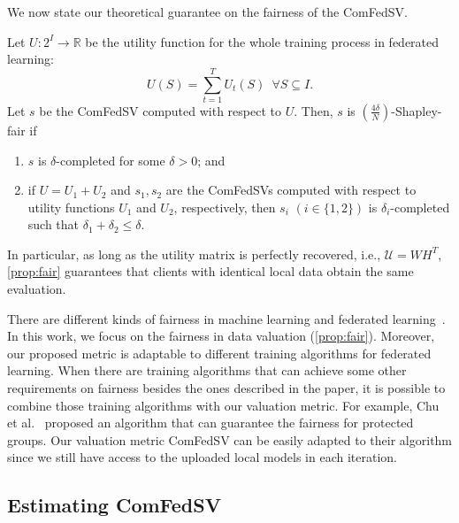 We now state our theoretical guarantee on the fairness of the ComFedSV. 

\begin{theorem} \label{prop:fair}
    Let $U: 2^I \to \mathbb{R}$ be the utility function for the whole training process in federated learning: 
    \[U(S) = \sum_{t=1}^T U_t(S) \enspace \forall S \subseteq I.\]
    Let $s$ be the ComFedSV computed with respect to $U$.  Then, $s$ is $(\frac{4\delta}{N})$-Shapley-fair if
    \begin{enumerate}
        \item  $s$ is $\delta$-completed for some $\delta > 0$; and 
        \item if $U = U_1 + U_2$ and $s_1, s_2$ are the ComFedSVs computed with respect to utility functions $U_1$ and $U_2$, respectively, then $s_i$ $(i \in \{1,2\})$ is $\delta_i$-completed such that $\delta_1 + \delta_2 \leq \delta$. 
    \end{enumerate}
\end{theorem}

In particular, as long as the utility matrix is perfectly recovered, i.e., $\mathcal{U} = WH^T$, \autoref{prop:fair} guarantees that clients with identical local data obtain the same evaluation.

There are different kinds of fairness in machine learning and federated learning~\cite{zemel2013learning,donini2018empirical,li2019fair,lyu2020collaborative,chu2021fedfair}. In this work, we focus on the fairness in data valuation (\autoref{prop:fair}). Moreover, our proposed metric is adaptable to different training algorithms for federated learning. When there are training algorithms that can achieve some other requirements on fairness besides the ones described in the paper, it is possible to combine those training algorithms with our valuation metric. For example, Chu et al.~\cite{chu2021fedfair} proposed an algorithm that can guarantee the fairness for protected groups. Our valuation metric ComFedSV can be easily adapted to their algorithm since we still have access to the uploaded local models in each iteration.

\subsection{Estimating ComFedSV} \label{sec:7.5.4}

